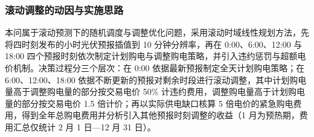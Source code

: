 
\subsubsection{滚动调整的动因与实施思路}

本问属于滚动预测下的随机调度与调整优化问题，采用滚动时域线性规划方法，先将四时刻发布的小时光伏预报插值到 10 分钟分辨率，再在 0:00、6:00、12:00 与 18:00 四个预报时刻依次制定计划购电与调整购电策略，并引入违约惩罚与超额电价机制。决策过程分三个层次：在 0:00 依据最新预报制定全天计划购电策略；在 6:00、12:00、18:00 依据不断更新的预报对剩余时段进行滚动调整，其中计划购电量高于调整购电量的部分按交易电价 50\% 计违约费用，调整购电量高于计划购电量的部分按交易电价 1.5 倍计价；再以实际供电缺口核算 5 倍电价的紧急购电费用，得到全年总购电费用并分析引入其他预报时刻调整的收益（1 月为预热期，费用汇总仅统计 2 月 1 日—12 月 31 日）。
